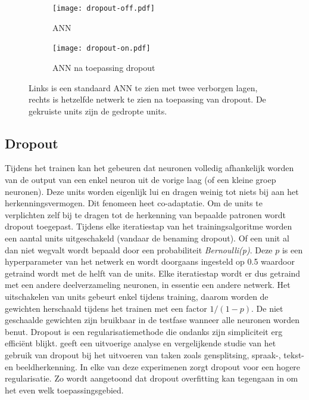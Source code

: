 \begin{figure}[!t]
	\centering
	\begin{subfigure}{.5\textwidth}
		\centering
		\texttt{[image: dropout-off.pdf]}
		\caption{ANN}
		\label{fig:neuron}
	\end{subfigure}%
	\begin{subfigure}{.5\textwidth}
		\centering
		\texttt{[image: dropout-on.pdf]}
		\caption{ANN na toepassing dropout}
		\label{fig:ANN}
	\end{subfigure}
	\caption{Links is een standaard ANN te zien met twee verborgen lagen, rechts is hetzelfde netwerk te zien na toepassing van dropout. De gekruiste units zijn de gedropte units.}
	\label{fig:test}
\end{figure}
\subsection{Dropout}
Tijdens het trainen kan het gebeuren dat neuronen volledig afhankelijk worden van de output van een enkel neuron uit de vorige laag (of een kleine groep neuronen). Deze units worden eigenlijk lui en dragen weinig tot niets bij aan het herkenningsvermogen. Dit fenomeen heet co-adaptatie. Om de units te verplichten zelf bij te dragen tot de herkenning van bepaalde patronen wordt dropout toegepast.
\npar Tijdens elke iteratiestap van het trainingsalgoritme worden een aantal units uitgeschakeld (vandaar de benaming dropout). Of een unit al dan niet wegvalt wordt bepaald door een probabiliteit \textit{Bernoulli(p)}. Deze $p$ is een hyperparameter van het netwerk en wordt doorgaans ingesteld op 0.5 waardoor getraind wordt met de helft van de units. Elke iteratiestap wordt er dus getraind met een andere deelverzameling neuronen, in essentie een andere netwerk. Het uitschakelen van units gebeurt enkel tijdens training, daarom worden de gewichten herschaald tijdens het trainen met een factor $1/(1-p)$. De niet geschaalde gewichten zijn bruikbaar in de testfase wanneer alle neuronen worden benut.
\npar Dropout is een regularisatiemethode die ondanks zijn simpliciteit erg effici\"ent blijkt. \cite{dropout} geeft een uitvoerige analyse en vergelijkende studie van het gebruik van dropout bij het uitvoeren van taken zoals gensplitsing, spraak-, tekst- en beeldherkenning. In elke van deze experimenen zorgt dropout voor een hogere regularisatie. Zo wordt aangetoond dat dropout overfitting kan tegengaan in om het even welk toepassingsgebied.

